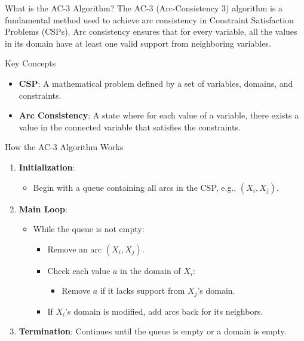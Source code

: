 \documentclass[aspectratio=169]{beamer}
\begin{document}
\begin{frame}{What is the AC-3 Algorithm?}
    The AC-3 (Arc-Consistency 3) algorithm is a fundamental method used to achieve arc consistency in Constraint Satisfaction Problems (CSPs). Arc consistency ensures that for every variable, all the values in its domain have at least one valid support from neighboring variables.
    \begin{block}{Key Concepts}
        \begin{itemize}
            \item \textbf{CSP}: A mathematical problem defined by a set of variables, domains, and constraints.
            \item \textbf{Arc Consistency}: A state where for each value of a variable, there exists a value in the connected variable that satisfies the constraints.
        \end{itemize}
    \end{block}
\end{frame}

\begin{frame}{How the AC-3 Algorithm Works}
    \begin{enumerate}
        \item \textbf{Initialization}:
        \begin{itemize}
            \item Begin with a queue containing all arcs in the CSP, e.g., \( (X_i, X_j) \).
        \end{itemize}
        
        \item \textbf{Main Loop}:
        \begin{itemize}
            \item While the queue is not empty:
                \begin{itemize}
                    \item Remove an arc \( (X_i, X_j) \).
                    \item Check each value \( a \) in the domain of \( X_i \):
                        \begin{itemize}
                            \item Remove \( a \) if it lacks support from \( X_j \)'s domain.
                        \end{itemize}
                    \item If \( X_i \)'s domain is modified, add arcs back for its neighbors.
                \end{itemize}
        \end{itemize}
        
        \item \textbf{Termination}: Continues until the queue is empty or a domain is empty.
    \end{enumerate}
\end{frame}
\end{document}
